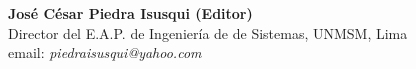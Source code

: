 \begin{center}
\textbf{José César Piedra Isusqui (Editor)}\\
Director del E.A.P. de Ingenierí­a de de Sistemas, UNMSM, Lima\\
email: \textit{piedraisusqui@yahoo.com}
\end{center}
